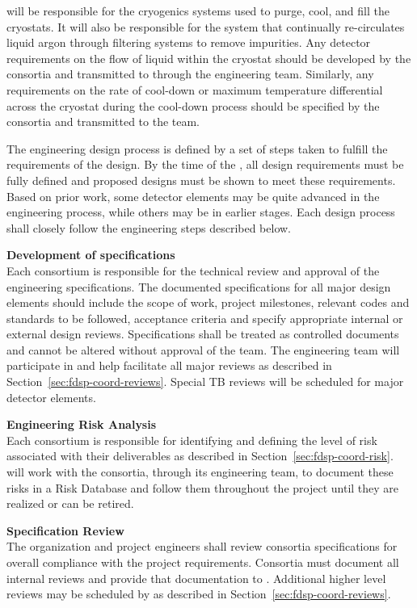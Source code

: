  will be responsible for the cryogenics systems used to purge,
cool, and fill the cryostats.  It will also be responsible for the
system that continually re-circulates liquid argon through filtering
systems to remove impurities.  Any detector requirements on the flow
of liquid within the cryostat should be developed by the consortia and
transmitted to  through the  engineering team.  Similarly,
any requirements on the rate of cool-down or maximum temperature
differential across the cryostat during the cool-down process should
be specified by the consortia and transmitted to the  team.

The engineering design process is defined by a set of steps taken to
fulfill the requirements of the design.  By the time of the , all design requirements must be fully defined and
proposed designs must be shown to meet these requirements.  Based on
prior work, some detector elements may be quite advanced in the
engineering process, while others may be in earlier stages.  Each
design process shall closely follow the engineering steps described
below.


{\bf Development of specifications}\\ Each consortium is responsible
for the technical review and approval of the engineering
specifications.  The documented specifications for all major design
elements should include the scope of work, project milestones,
relevant codes and standards to be followed, acceptance criteria and
specify appropriate internal or external design reviews.
Specifications shall be treated as controlled documents and cannot be
altered without approval of the 
team.  The  engineering team will participate in and help facilitate
all major reviews as described in
Section~\ref{sec:fdsp-coord-reviews}.  Special TB reviews
will be scheduled for major detector elements.

{\bf Engineering Risk Analysis}\\ Each consortium is responsible for
identifying and defining the level of risk associated with their
deliverables as described in Section~\ref{sec:fdsp-coord-risk}.
  will work with the consortia,
through its  engineering team, to document these risks in a Risk
Database and follow them throughout the project until they are
realized or can be retired.

{\bf Specification Review}\\
The   organization and project engineers
shall review consortia specifications for overall compliance with the
project requirements.  Consortia must document all internal reviews
and provide that documentation to .
Additional higher level reviews may be scheduled by 
as described in Section~\ref{sec:fdsp-coord-reviews}.

